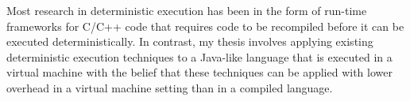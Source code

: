 Most research in deterministic execution has been in the form of
run-time frameworks for C/C++ code that requires code to be recompiled
before it can be executed deterministically.  In contrast, my thesis
involves applying existing deterministic execution techniques to a
Java-like language that is executed in a virtual machine with the
belief that these techniques can be applied with lower overhead in a
virtual machine setting than in a compiled language.

